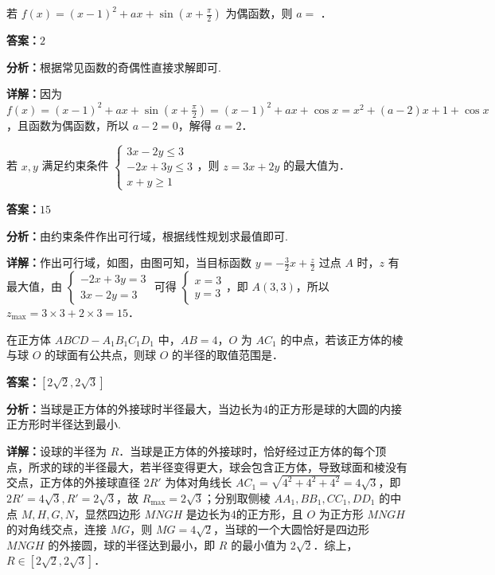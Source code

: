 \begin{question}[points=5]
若 $f(x)=(x-1)^2+ax+\sin\left(x+\frac{\pi}{2}\right)$ 为偶函数，则 $a=$ ．
\fillin[{$2$}]
\begin{solution}
\textbf{答案：}$2$

\textbf{分析：}根据常见函数的奇偶性直接求解即可.

\textbf{详解：}因为 $f(x)=(x-1)^2+ax+\sin\left(x+\frac{\pi}{2}\right) = (x-1)^2+ax+\cos x = x^2+(a-2)x+1+\cos x$，且函数为偶函数，所以 $a-2=0$，解得 $a=2$．
\end{solution}
\end{question}

\begin{question}[points=5]
若 $x,y$ 满足约束条件 $\begin{cases}3x-2y\le3\\-2x+3y\le3\\x+y\ge1\end{cases}$，则 $z=3x+2y$ 的最大值为．
\fillin[{$15$}]
\begin{solution}
\textbf{答案：}$15$

\textbf{分析：}由约束条件作出可行域，根据线性规划求最值即可.

\textbf{详解：}作出可行域，如图，由图可知，当目标函数 $y=-\frac{3}{2}x+\frac{z}{2}$ 过点 $A$ 时，$z$ 有最大值，由 $\begin{cases}-2x+3y=3\\3x-2y=3\end{cases}$ 可得 $\begin{cases}x=3\\y=3\end{cases}$，即 $A(3,3)$，所以 $z_{\max}=3\times3+2\times3=15$．
\end{solution}
\end{question}

\begin{question}[points=5]
在正方体 $ABCD-A_1B_1C_1D_1$ 中，$AB=4$，$O$ 为 $AC_1$ 的中点，若该正方体的棱与球 $O$ 的球面有公共点，则球 $O$ 的半径的取值范围是．
\begin{solution}
\textbf{答案：}$[2\sqrt{2}, 2\sqrt{3}]$

\textbf{分析：}当球是正方体的外接球时半径最大，当边长为4的正方形是球的大圆的内接正方形时半径达到最小.

\textbf{详解：}设球的半径为 $R$．当球是正方体的外接球时，恰好经过正方体的每个顶点，所求的球的半径最大，若半径变得更大，球会包含正方体，导致球面和棱没有交点，正方体的外接球直径 $2R'$ 为体对角线长 $AC_1=\sqrt{4^2+4^2+4^2}=4\sqrt{3}$，即 $2R'=4\sqrt{3}, R'=2\sqrt{3}$，故 $R_{\max}=2\sqrt{3}$；分别取侧棱 $AA_1, BB_1, CC_1, DD_1$ 的中点 $M,H,G,N$，显然四边形 $MNGH$ 是边长为4的正方形，且 $O$ 为正方形 $MNGH$ 的对角线交点，连接 $MG$，则 $MG=4\sqrt{2}$，当球的一个大圆恰好是四边形 $MNGH$ 的外接圆，球的半径达到最小，即 $R$ 的最小值为 $2\sqrt{2}$．综上，$R\in[2\sqrt{2},2\sqrt{3}]$．
\end{solution}
\end{question}

